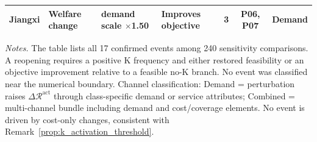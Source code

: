 \begin{table}[p]
\begin{tabular}{@{}p{}lp{}p{}ccl@{}}
Jiangxi & Welfare change & demand scale $\times$1.50 & Improves objective & 3 & P06, P07 & Demand \\
\bottomrule
\end{tabular}
\parbox{0.96\textwidth}{\footnotesize\textit{Notes.} The table lists all 17 confirmed events among 240 sensitivity comparisons. A reopening requires a positive K frequency and either restored feasibility or an objective improvement relative to a feasible no-K branch. No event was classified near the numerical boundary. Channel classification: Demand = perturbation raises $\Delta\mathcal R^{\mathrm{act}}$ through class-specific demand or service attributes; Combined = multi-channel bundle including demand and cost/coverage elements. No event is driven by cost-only changes, consistent with Remark~\ref{prop:k_activation_threshold}.}
\endgroup
\end{table}
